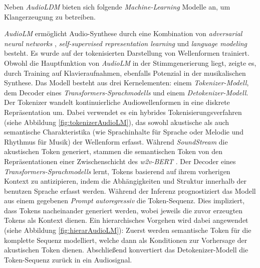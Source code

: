 \documentclass[
  a4paper,  %
  twoside,  %
  bibliography=totoc,
  headsepline,
  cleardoublepage=empty,
  parskip=half,
  draft=false
]{scrbook}
\begin{document}
Neben \emph{AudioLDM} \cite{liu_audioldm_2023} bieten sich folgende \emph{Machine-Learning} Modelle an, um Klangerzeugung zu betreiben.

\emph{AudioLM} \cite{borsos_audiolm_2022} ermöglicht Audio-Synthese durch eine Kombination von \emph{adversarial neural networks} \cite{goodfellow_generative_2014}, \emph{self-supervised representation learning} \cite{chung_w2v-bert_2021} und \emph{language modeling} \cite{roberts_scaling_2022} besteht. Es wurde auf der tokenisierten Darstellung von Wellenformen trainiert. Obwohl die Hauptfunktion von \emph{AudioLM} in der Stimmgenerierung liegt, zeigte es, durch Training auf Klavieraufnahmen, ebenfalls Potenzial in der musikalischen Synthese.  Das Modell besteht aus drei Kernelementen: einem \emph{Tokenizer-Modell}, dem Decoder eines \emph{Transformers-Sprachmodells} und einem \emph{Detokenizer-Modell}. Der Tokenizer wandelt kontinuierliche Audiowellenformen in eine diskrete Repräsentation um. Dabei verwendet es ein hybrides Tokenisierungsverfahren (siehe Abbildung \ref{fig:tokenizerAudioLM}), das sowohl akustische als auch semantische Charakteristika (wie Sprachinhalte für Sprache oder Melodie und Rhythmus für Musik) der Wellenform erfasst. Während \emph{SoundStream} \cite{zeghidour_soundstream_2021} die akustischen Token generiert, stammen die semantischen Token von den Repräsentationen einer Zwischenschicht des \emph{w2v-BERT} \cite{chung_w2v-bert_2021}. Der Decoder eines \emph{Transformers-Sprachmodells} \cite{vaswani_attention_2017} lernt, Tokens basierend auf ihrem vorherigen Kontext zu antizipieren, indem die Abhängigkeiten und Struktur innerhalb der benutzen Sprache erfasst werden. Während der Inferenz prognostiziert das Modell aus einem gegebenen \emph{Prompt} \emph{autoregressiv} die Token-Sequenz. Dies impliziert, dass Tokens nacheinander generiert werden, wobei jeweils die zuvor erzeugten Tokens als Kontext dienen. Ein hierarchisches Vorgehen wird dabei angewendet (siehe Abbildung \ref{fig:hierarAudioLM}): Zuerst werden semantische Token für die komplette Sequenz modelliert, welche dann als Konditionen zur Vorhersage der akustischen Token dienen. Abschließend konvertiert das Detokenizer-Modell die Token-Sequenz zurück in ein Audiosignal. \cite{borsos_audiolm_2022}
\end{document}
